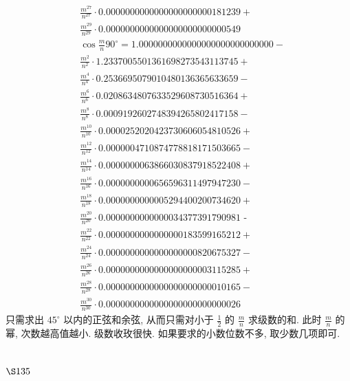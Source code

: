 \[
\begin{aligned}
& \frac{m^{27}}{n^{27}} \cdot 0.0000000000000000000000181239+ \\
& \frac{m^{29}}{n^{29}} \cdot 0.0000000000000000000000000549 \\
& \cos \frac{m}{n} 90^{\circ}=1.0000000000000000000000000000- \\
& \frac{m^{2}}{n^{2}} \cdot 1.2337005501361698273543113745+ \\
& \frac{m^{4}}{n^{4}} \cdot 0.2536695079010480136365633659- \\
& \frac{m^{6}}{n^{6}} \cdot 0.0208634807633529608730516364+ \\
& \frac{m^{8}}{n^{8}} \cdot 0.0009192602748394265802417158- \\
& \frac{m^{10}}{n^{10}} \cdot 0.0000252020423730606054810526+ \\
& \frac{m^{12}}{n^{12}} \cdot 0.0000004710874778818171503665- \\
& \frac{m^{14}}{n^{14}} \cdot 0.0000000063866030837918522408+ \\
& \frac{m^{16}}{n^{16}} \cdot 0.0000000000656596311497947230- \\
& \frac{m^{18}}{n^{18}} \cdot 0.0000000000005294400200734620+ \\
& \frac{m^{20}}{n^{20}} \cdot 0.0000000000000034377391790981 \text { - } \\
& \frac{m^{22}}{n^{22}} \cdot 0.0000000000000000183599165212+ \\
& \frac{m^{24}}{n^{24}} \cdot 0.0000000000000000000820675327- \\
& \frac{m^{26}}{n^{26}} \cdot 0.0000000000000000000003115285+ \\
& \frac{m^{28}}{n^{28}} \cdot 0.0000000000000000000000010165- \\
& \frac{m^{30}}{n^{30}} \cdot 0.0000000000000000000000000026
\end{aligned}
\]
只需求出 $45^{\circ}$ 以内的正弦和余弦, 从而只需对小于 $\frac{1}{2}$ 的 $\frac{m}{n}$ 求级数的和. 此时 $\frac{m}{n}$ 的幂, 次数越高值越小. 级数收玫很快. 如果要求的小数位数不多, 取少数几项即可. 

\section{$\S 135$}

